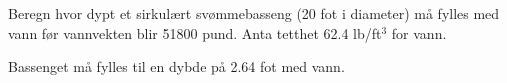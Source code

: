 

Beregn hvor dypt et sirkulært svømmebasseng (20 fot i diameter) må fylles med vann før vannvekten blir 51800 pund. Anta tetthet 62.4 lb/ft$^{3}$ for vann.







Bassenget må fylles til en dybde på 2.64 fot med vann. 











